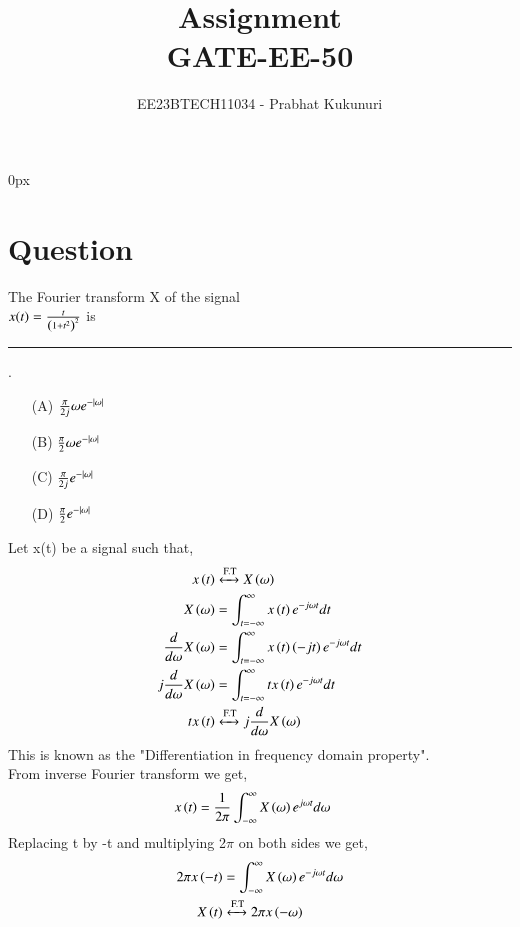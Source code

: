 \documentclass[journal,12pt,twocolumn]{IEEEtran}
\theoremstyle{remark}
\begin{document}
\parindent 0px


\vspace{3cm}

\title{Assignment\\[1ex]GATE-EE-50}
\author{EE23BTECH11034 - Prabhat Kukunuri$^{}$%
}
\maketitle
\newpage
\bigskip

\renewcommand{\thefigure}{\theenumi}
\renewcommand{\thetable}{\theenumi}
\section{Question}
The Fourier transform X of the signal\\ $x(t)=\frac{t}{\left(1+t^2\right)^2}$ is \rule{1.5cm}{0.15mm}.
\begin{enumerate}
	\item[(A)] $\frac{\pi}{2j}\omega e^{-\left\vert\omega\right\vert}$
	\item[(B)] $\frac{\pi}{2}\omega e^{-\left\vert\omega\right\vert}$
	\item[(C)] $\frac{\pi}{2j}e^{-\left\vert\omega\right\vert}$
	\item[(D)] $\frac{\pi}{2}e^{-\left\vert\omega\right\vert}$
\end{enumerate}
\solution
Let x(t) be a signal such that,
\begin{align}
    x\left(t\right)&\xleftrightarrow{\text{F.T}} X\left(\omega\right)\\
    X\left(\omega\right)&=\int_{t=-\infty}^{\infty}x\left(t\right)e^{-j\omega t}dt\\
    \frac{d}{d\omega}X\left(\omega\right)&=\int_{t=-\infty}^{\infty}x\left(t\right)\left(-jt\right)e^{-j\omega t}dt\\
    j\frac{d}{d\omega}X\left(\omega\right)&=\int_{t=-\infty}^{\infty}tx\left(t\right)e^{-j\omega t}dt\\
    tx\left(t\right)&\xleftrightarrow{\text{F.T}} j\frac{d}{d\omega}X\left(\omega\right)
\end{align}
This is known as the "Differentiation in frequency domain property".\\
From inverse Fourier transform we get,
\begin{align}
    x\left(t\right)&=\frac{1}{2\pi}\int_{-\infty}^{\infty}X\left(\omega\right)e^{j\omega t}d\omega
\end{align}
Replacing t by -t and multiplying 2$\pi$ on both sides we get,
\begin{align}
    2\pi x\left(-t\right)&=\int_{-\infty}^{\infty}X\left(\omega\right)e^{-j\omega t}d\omega\\
    X\left(t\right)&\xleftrightarrow{\text{F.T}} 2\pi x\left(-\omega\right)
\end{align}
\end{document}
